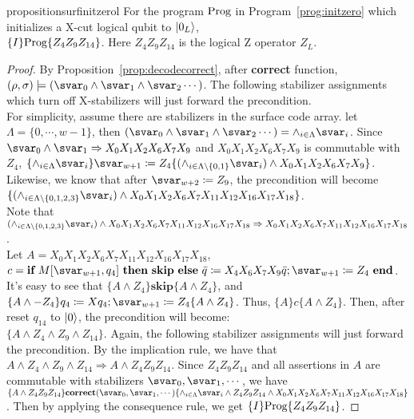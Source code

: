 \begin{restatable}{proposition}{surfinitzerol}
For the program $\text{Prog}$ in Program~\ref{prog:initzero} which initializes a X-cut logical qubit to $\vert 0_L \rangle$, \\
$\{I\}\text{Prog}\{Z_4Z_9Z_{14}\}$. Here $Z_4Z_9Z_{14}$ is the logical Z operator $Z_{L}$.
\end{restatable}
\begin{proof}
By Proposition~\ref{prop:decodecorrect}, after \textbf{correct} function, $(\rho,\sigma)\models (\svar_0 \wedge \svar_1 \wedge \svar_2 \cdots)$. The following stabilizer assignments which turn off X-stabilizers will just forward the precondition. \\
For simplicity, assume there are {\stabnum} stabilizers in the surface code array. let $\Lambda = \{0,\cdots,w-1\}$, then $(\svar_0 \wedge \svar_1 \wedge \svar_2 \cdots) = \wedge_{i\in \Lambda}\svar_i$. Since $\svar_0 \wedge \svar_1 \Rightarrow X_0X_1X_2X_6X_7X_9$ and $X_0X_1X_2X_6X_7X_9$ is commutable with $Z_4$, $\{\wedge_{i\in \Lambda}\svar_i\}\svar_{\stabnum +1} \coloneqq Z_{4}\{(\wedge_{i\in \Lambda\setminus \{0,1\}}\svar_i) \wedge X_0X_1X_2X_6X_7X_9\}$. Likewise, we know that after $\svar_{\stabnum +2} \coloneqq Z_{9}$, the precondition will become \\
$\{(\wedge_{i\in \Lambda\setminus \{0,1,2,3\}}\svar_i) \wedge X_0X_1X_2X_6X_7X_{11}X_{12}X_{16}X_{17}X_{18}\}$. \\
Note that $(\wedge_{i\in \Lambda\setminus \{0,1,2,3\}}\svar_i) \wedge X_0X_1X_2X_6X_7X_{11}X_{12}X_{16}X_{17}X_{18} \Rightarrow X_0X_1X_2X_6X_7X_{11}X_{12}X_{16}X_{17}X_{18} $. \\
Let $A = X_0X_1X_2X_6X_7X_{11}X_{12}X_{16}X_{17}X_{18}$, \\
$c = \qif{\svar_{\stabnum +1}, q_4}{\textbf{skip}}{\bar{q} \coloneqq X_4X_6X_7X_9\bar{q}; \svar_{\stabnum +1} \coloneqq Z_{4}}$.
It's easy to see that $\{A \wedge Z_4\} \textbf{skip} \{A \wedge Z_4\}$, and $\{A \wedge -Z_4\} q_4 \coloneqq Xq_4; \svar_{\stabnum +1}\coloneqq Z_4 \{A \wedge Z_4\}$. Thus, $\{A\}c\{A \wedge Z_4\}$. Then, after reset $q_{14}$ to $\vert 0 \rangle$, the precondition will become: \\
$\{A \wedge Z_4 \wedge Z_9 \wedge Z_{14}\}$.
Again, the following stabilizer assignments will just forward the precondition. By the implication rule, we have that $A \wedge Z_4 \wedge Z_9 \wedge Z_{14} \Rightarrow A \wedge Z_4Z_9Z_{14}$. Since $Z_4Z_9Z_{14}$ and all assertions in $A$ are commutable with stabilizers $\svar_0, \svar_1, \cdots$, we have $\{ A \wedge Z_4Z_9Z_{14}\} \textbf{correct}(\svar_0,\svar_1,\cdots) \{\wedge_{i\in \Lambda} \svar_i \wedge Z_4Z_9Z_{14}  \wedge X_0X_1X_2X_6X_7X_{11}X_{12}X_{16}X_{17}X_{18} \}$. Then by applying the consequence rule, we get $\{I\}\text{Prog}\{Z_4Z_9Z_{14}\}$.
\end{proof}

